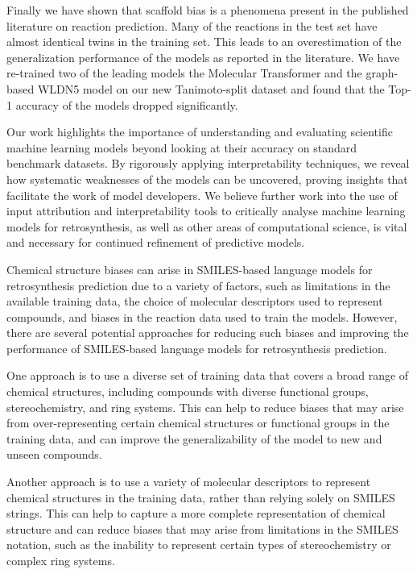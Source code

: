 Finally we have shown that scaffold bias is a phenomena present in the published literature on reaction prediction. Many of the reactions in the test set have almost identical twins in the training set. This leads to an overestimation of the generalization performance of the models as reported in the literature. We have re-trained two of the leading models the Molecular Transformer and the graph-based WLDN5 model on our new Tanimoto-split dataset and found that the Top-1 accuracy of the models dropped significantly.

Our work highlights the importance of understanding and evaluating scientific machine learning models beyond looking at their accuracy on standard benchmark datasets. By rigorously applying interpretability techniques, we reveal how systematic weaknesses of the models can be uncovered, proving insights that facilitate the work of model developers. We believe further work into the use of input attribution and interpretability tools to critically analyse machine learning models for retrosynthesis, as well as other areas of computational science, is vital and necessary for continued refinement of predictive models.



Chemical structure biases can arise in SMILES-based language models for retrosynthesis prediction due to a variety of factors, such as limitations in the available training data, the choice of molecular descriptors used to represent compounds, and biases in the reaction data used to train the models. However, there are several potential approaches for reducing such biases and improving the performance of SMILES-based language models for retrosynthesis prediction.

One approach is to use a diverse set of training data that covers a broad range of chemical structures, including compounds with diverse functional groups, stereochemistry, and ring systems. This can help to reduce biases that may arise from over-representing certain chemical structures or functional groups in the training data, and can improve the generalizability of the model to new and unseen compounds.

Another approach is to use a variety of molecular descriptors to represent chemical structures in the training data, rather than relying solely on SMILES strings. This can help to capture a more complete representation of chemical structure and can reduce biases that may arise from limitations in the SMILES notation, such as the inability to represent certain types of stereochemistry or complex ring systems.

